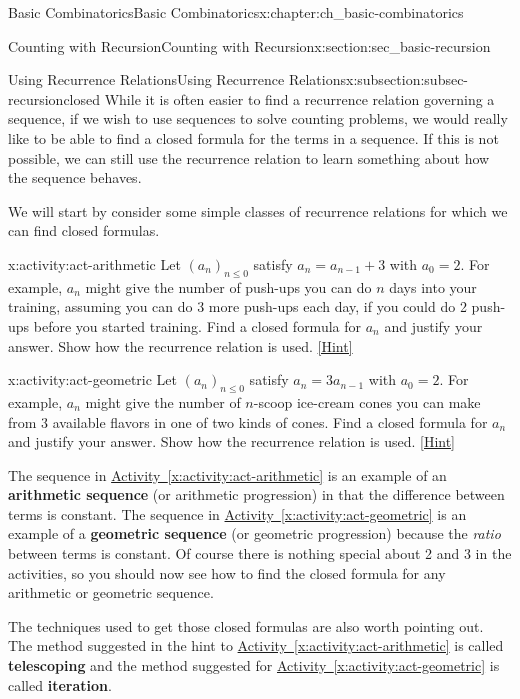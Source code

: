\documentclass[oneside,10pt,]{book}
\newcommand{\terminology}[1]{\textbf{#1}}
\numberwithin{equation}{chapter}
\begin{document}
\begin{chapterptx}{Basic Combinatorics}{}{Basic Combinatorics}{}{}{x:chapter:ch_basic-combinatorics}
\begin{sectionptx}{Counting with Recursion}{}{Counting with Recursion}{}{}{x:section:sec_basic-recursion}
\begin{subsectionptx}{Using Recurrence Relations}{}{Using Recurrence Relations}{}{}{x:subsection:subsec-recursionclosed}
While it is often easier to find a recurrence relation governing a sequence, if we wish to use sequences to solve counting problems, we would really like to be able to find a closed formula for the terms in a sequence. If this is not possible, we can still use the recurrence relation to learn something about how the sequence behaves.%
\par
We will start by consider some simple classes of recurrence relations for which we can find closed formulas.%
\begin{activity}{}{x:activity:act-arithmetic}%
Let \((a_n)_{n \le 0}\) satisfy \(a_n = a_{n-1} + 3\) with \(a_0 = 2\).  For example, \(a_n\) might give the number of push-ups you can do \(n\) days into your training, assuming you can do 3 more push-ups each day, if you could do 2 push-ups before you started training.  Find a closed formula for \(a_n\) and justify your answer.  Show how the recurrence relation is used.%
\space\hspace*{0pt}\hfill{\tiny\hyperlink{g:hint:idm2883-back}{[Hint]}}\end{activity}
\begin{activity}{}{x:activity:act-geometric}%
Let \((a_n)_{n \le 0}\) satisfy \(a_n = 3a_{n-1}\) with \(a_0 = 2\).  For example, \(a_n\) might give the number of \(n\)-scoop ice-cream cones you can make from 3 available flavors in one of two kinds of cones.  Find a closed formula for \(a_n\) and justify your answer.  Show how the recurrence relation is used.%
\space\hspace*{0pt}\hfill{\tiny\hyperlink{g:hint:idm2897-back}{[Hint]}}\end{activity}
The sequence in \hyperref[x:activity:act-arithmetic]{Activity~\ref{x:activity:act-arithmetic}} is an example of an \terminology{arithmetic sequence} (or arithmetic progression) in that the difference between terms is constant.  The sequence in \hyperref[x:activity:act-geometric]{Activity~\ref{x:activity:act-geometric}} is an example of a \terminology{geometric sequence} (or geometric progression) because the \emph{ratio} between terms is constant.  Of course there is nothing special about 2 and 3 in the activities, so you should now see how to find the closed formula for any arithmetic or geometric sequence.%
\par
The techniques used to get those closed formulas are also worth pointing out.  The method suggested in the hint to \hyperref[x:activity:act-arithmetic]{Activity~\ref{x:activity:act-arithmetic}} is called \terminology{telescoping} and the method suggested for \hyperref[x:activity:act-geometric]{Activity~\ref{x:activity:act-geometric}} is called \terminology{iteration}.%

\end{subsectionptx}
\end{sectionptx}
\end{chapterptx}
\end{document}
